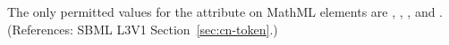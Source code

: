 The only permitted values for the attribute  on MathML
 elements are , , , and
.  (References: SBML L3V1 Section~\ref{sec:cn-token}.)
